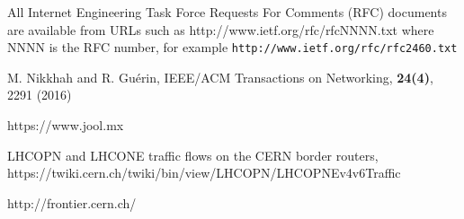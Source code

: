 \begin{thebibliography}{}

All Internet Engineering Task Force Requests For Comments (RFC) documents are available
from URLs such as http://www.ietf.org/rfc/rfcNNNN.txt where NNNN is the RFC number, for example {\tt http://www.ietf.org/rfc/rfc2460.txt}

M. Nikkhah and R. Gu\'erin, 
IEEE/ACM Transactions on Networking, {\bf 24(4)}, 2291 (2016)

https://www.jool.mx


LHCOPN and LHCONE traffic flows on the CERN border routers, 
https://twiki.cern.ch/twiki/bin/view/LHCOPN/LHCOPNEv4v6Traffic


http://frontier.cern.ch/








\end{thebibliography}
